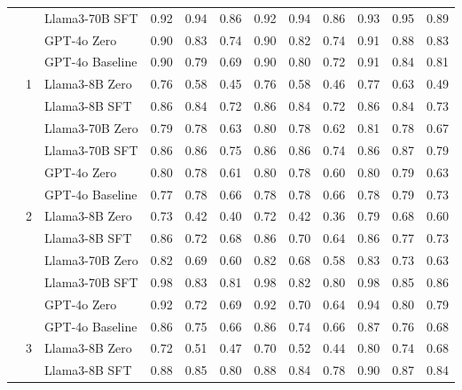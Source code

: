 \begin{longtable}[t]{ll>{}l|rr>{}r|rr>{}r|rrr}
 &  & Llama3-70B SFT & 0.92 & 0.94 & 0.86 & 0.92 & 0.94 & 0.86 & 0.93 & 0.95 & 0.89\\

 &  & GPT-4o Zero & 0.90 & 0.83 & 0.74 & 0.90 & 0.82 & 0.74 & 0.91 & 0.88 & 0.83\\

 &  & GPT-4o Baseline & 0.90 & 0.79 & 0.69 & 0.90 & 0.80 & 0.72 & 0.91 & 0.84 & 0.81\\
\cmidrule{2-12}
 & 1 & Llama3-8B Zero & 0.76 & 0.58 & 0.45 & 0.76 & 0.58 & 0.46 & 0.77 & 0.63 & 0.49\\

 &  & Llama3-8B SFT & 0.86 & 0.84 & 0.72 & 0.86 & 0.84 & 0.72 & 0.86 & 0.84 & 0.73\\

 &  & Llama3-70B Zero & 0.79 & 0.78 & 0.63 & 0.80 & 0.78 & 0.62 & 0.81 & 0.78 & 0.67\\

 &  & Llama3-70B SFT & 0.86 & 0.86 & 0.75 & 0.86 & 0.86 & 0.74 & 0.86 & 0.87 & 0.79\\

 &  & GPT-4o Zero & 0.80 & 0.78 & 0.61 & 0.80 & 0.78 & 0.60 & 0.80 & 0.79 & 0.63\\

 &  & GPT-4o Baseline & 0.77 & 0.78 & 0.66 & 0.78 & 0.78 & 0.66 & 0.78 & 0.79 & 0.73\\
\cmidrule{2-12}
 & 2 & Llama3-8B Zero & 0.73 & 0.42 & 0.40 & 0.72 & 0.42 & 0.36 & 0.79 & 0.68 & 0.60\\

 &  & Llama3-8B SFT & 0.86 & 0.72 & 0.68 & 0.86 & 0.70 & 0.64 & 0.86 & 0.77 & 0.73\\

 &  & Llama3-70B Zero & 0.82 & 0.69 & 0.60 & 0.82 & 0.68 & 0.58 & 0.83 & 0.73 & 0.63\\

 &  & Llama3-70B SFT & 0.98 & 0.83 & 0.81 & 0.98 & 0.82 & 0.80 & 0.98 & 0.85 & 0.86\\

 &  & GPT-4o Zero & 0.92 & 0.72 & 0.69 & 0.92 & 0.70 & 0.64 & 0.94 & 0.80 & 0.79\\

 &  & GPT-4o Baseline & 0.86 & 0.75 & 0.66 & 0.86 & 0.74 & 0.66 & 0.87 & 0.76 & 0.68\\
\cmidrule{2-12}
 & 3 & Llama3-8B Zero & 0.72 & 0.51 & 0.47 & 0.70 & 0.52 & 0.44 & 0.80 & 0.74 & 0.68\\

 &  & Llama3-8B SFT & 0.88 & 0.85 & 0.80 & 0.88 & 0.84 & 0.78 & 0.90 & 0.87 & 0.84\\


\end{longtable}
